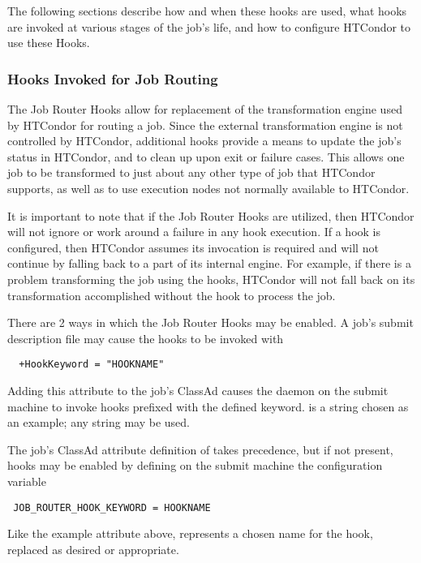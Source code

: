 The following sections describe how and when these hooks are used,
what hooks are invoked at various stages of the job's life, 
and how to configure HTCondor to use these Hooks.

\subsubsection{\label{sec:job-hooks-JR}
Hooks Invoked for Job Routing}

The Job Router Hooks allow for replacement of the transformation engine used
by HTCondor for routing a job.
Since the external transformation engine is not controlled by HTCondor,
additional hooks provide a means to update the job's
status in HTCondor, and to clean up upon exit or failure cases.
This allows one job to be transformed to just about any other type of job
that HTCondor supports,
as well as to use execution nodes not normally available to HTCondor.

It is important to note that if the Job Router Hooks are utilized, 
then HTCondor will not ignore or work around a failure in any hook execution.
If a hook is configured,
then HTCondor assumes its invocation is required and will not
continue by falling back to a part of its internal engine.
For example,
if there is a problem transforming the job using the hooks,
HTCondor will not fall back on its transformation accomplished without the hook
to process the job.

There are 2 ways in which the Job Router Hooks may be enabled.
A job's submit description file may cause the hooks to be invoked with 
\footnotesize
\begin{verbatim}
  +HookKeyword = "HOOKNAME"
\end{verbatim}
\normalsize
Adding this attribute to the job's ClassAd causes the 
daemon on the submit machine to invoke hooks prefixed with the defined keyword.
 is a string chosen as an example; any string may be used.

The job's ClassAd attribute definition of  takes
precedence,
but if not present, hooks may be enabled by defining on the submit machine
the configuration variable 
\footnotesize
\begin{verbatim}
 JOB_ROUTER_HOOK_KEYWORD = HOOKNAME
\end{verbatim}
\normalsize
Like the example attribute above,
 represents a chosen name for the hook, 
replaced as desired or appropriate.

